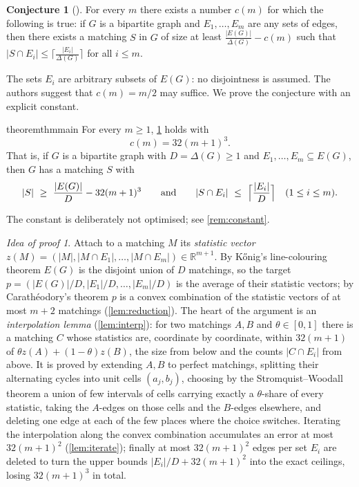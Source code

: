 \documentclass[11pt,a4paper]{article}
\theoremstyle{plain}
\theoremstyle{definition}
\newtheorem{conjecture}[theorem]{Conjecture}
\theoremstyle{remark}
\newtheorem*{proofidea}{Idea of proof}
\newcommand{\R}{\mathbb R}
\begin{document}
\begin{conjecture}[{\cite[Conjecture~1.15]{AABCKLZ}}]\label{conj:115}
For every $m$ there exists a number $c(m)$ for which the following is true: if $G$ is a bipartite graph and $E_1,\dots,E_m$ are any sets of edges, then there exists a matching $S$ in $G$ of size at least $\frac{|E(G)|}{\Delta(G)}-c(m)$ such that $|S\cap E_i|\le\bigl\lceil\frac{|E_i|}{\Delta(G)}\bigr\rceil$ for all $i\le m$.
\end{conjecture}

The sets $E_i$ are arbitrary subsets of $E(G)$: no disjointness is assumed. The authors suggest that $c(m)=m/2$ may suffice. We prove the conjecture with an explicit constant.

\begin{restatable}{theorem}{thmmain}\label{thm:main}
For every $m\ge1$, \cref{conj:115} holds with
\[
 c(m)=32(m+1)^3 .
\]
That is, if $G$ is a bipartite graph with $D=\Delta(G)\ge1$ and $E_1,\dots,E_m\subseteq E(G)$, then $G$ has a matching $S$ with
\[
 |S|\ \ge\ \frac{|E(G)|}{D}-32(m+1)^3
 \qquad\text{and}\qquad
 |S\cap E_i|\ \le\ \Bigl\lceil\frac{|E_i|}{D}\Bigr\rceil\quad(1\le i\le m).
\]
\end{restatable}

The constant is deliberately not optimised; see \cref{rem:constant}.

\begin{proofidea}
Attach to a matching $M$ its \emph{statistic vector} $z(M)=(|M|,|M\cap E_1|,\dots,|M\cap E_m|)\in\R^{m+1}$. By Kőnig's line-colouring theorem $E(G)$ is the disjoint union of $D$ matchings, so the target $p=(|E(G)|/D,|E_1|/D,\dots,|E_m|/D)$ is the average of their statistic vectors; by Carathéodory's theorem $p$ is a convex combination of the statistic vectors of at most $m+2$ matchings (\cref{lem:reduction}). The heart of the argument is an \emph{interpolation lemma} (\cref{lem:interp}): for two matchings $A,B$ and $\theta\in[0,1]$ there is a matching $C$ whose statistics are, coordinate by coordinate, within $32(m+1)$ of $\theta z(A)+(1-\theta)z(B)$, the size from below and the counts $|C\cap E_i|$ from above. It is proved by extending $A,B$ to perfect matchings, splitting their alternating cycles into unit cells $(a_j,b_j)$, choosing by the Stromquist--Woodall theorem a union of few intervals of cells carrying exactly a $\theta$-share of every statistic, taking the $A$-edges on those cells and the $B$-edges elsewhere, and deleting one edge at each of the few places where the choice switches. Iterating the interpolation along the convex combination accumulates an error at most $32(m+1)^2$ (\cref{lem:iterate}); finally at most $32(m+1)^2$ edges per set $E_i$ are deleted to turn the upper bounds $|E_i|/D+32(m+1)^2$ into the exact ceilings, losing $32(m+1)^3$ in total.
\end{proofidea}
\end{document}
